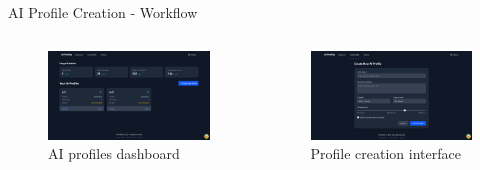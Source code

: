 \documentclass[aspectratio=169]{beamer}
\begin{document}
\begin{frame}{AI Profile Creation - Workflow}
    \begin{columns}
        \begin{figure}
            \includegraphics[width=\textwidth,height=0.55\textheight,keepaspectratio]{../pfe-pics/ai-profile-creation/dashboared_befor_adding_a_new_ai_profile.png}
            \caption{AI profiles dashboard}
        \end{figure}
        \begin{figure}
            \includegraphics[width=\textwidth,height=0.55\textheight,keepaspectratio]{../pfe-pics/ai-profile-creation/creating_and_ai_prifile.png}
            \caption{Profile creation interface}
        \end{figure}
    \end{columns}
\end{frame}
\end{document}
